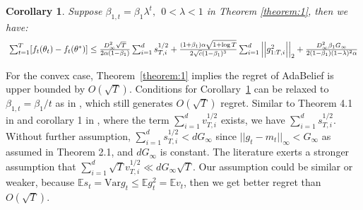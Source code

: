 \documentclass{article}
\newtheorem{corollary}{Corollary}[theorem]
\begin{document}
\begin{corollary}
\label{corollary:1}
Suppose $\beta_{1,t} = \beta_1 \lambda^t,\ \ 0<\lambda<1$ in Theorem  \eqref{theorem:1}, then we have:
\begin{equation}
\scalebox{0.95}{
$
\sum_{t=1}^T [f_t(\theta_t) - f_t(\theta^*)] \leq  \frac{D_\infty^2 \sqrt{T}}{2 \alpha (1-\beta_1)} \sum_{i=1}^d s_{T,i}^{1/2}
+  \frac{(1+\beta_1 )\alpha \sqrt{1 + \log T}}{2 \sqrt{c} (1 - \beta_1)^3} \sum_{i=1}^d \Big \vert \Big \vert g_{1:T,i}^2 \Big \vert \Big \vert_2 \nonumber
+ \frac{D_\infty^2 \beta_1 G_\infty}{2 (1-\beta_{1}) (1-\lambda)^2 \alpha}
$
}
\end{equation}
\end{corollary}
For the convex case, Theorem~\ref{theorem:1} implies the regret of AdaBelief is upper bounded by $O(\sqrt{T})$.
Conditions for Corollary~\ref{corollary:1} can be relaxed to $\beta_{1,t}=\beta_1 / t$ as in \cite{reddi2019convergence}, which still generates $O(\sqrt{T})$ regret. Similar to Theorem 4.1 in \cite{kingma2014adam} and corollary 1 in \cite{reddi2019convergence}, where the term $\sum_{i=1}^d v_{T,i}^{1/2}$ exists, we have $\sum_{i=1}^d s_{T,i}^{1/2}$. Without further assumption, $\sum_{i=1}^d s_{T,i}^{1/2} < d G_\infty$ since $\vert \vert g_t - m_t\vert \vert_\infty < G_\infty$ as assumed in Theorem 2.1, and $d G_\infty$ is constant. The literature \cite{kingma2014adam,reddi2019convergence, duchi2011adaptive} exerts a stronger assumption that $\sum_{i=1}^d \sqrt{T} v_{T,i}^{1/2} \ll d G_\infty \sqrt{T}$. Our assumption could be similar or weaker, because $\mathbb{E} s_t = \mathrm{Var} g_t \leq \mathbb{E} g_t^2 = \mathbb{E} v_t$, then we get better regret than $O(\sqrt{T})$.
\end{document}
